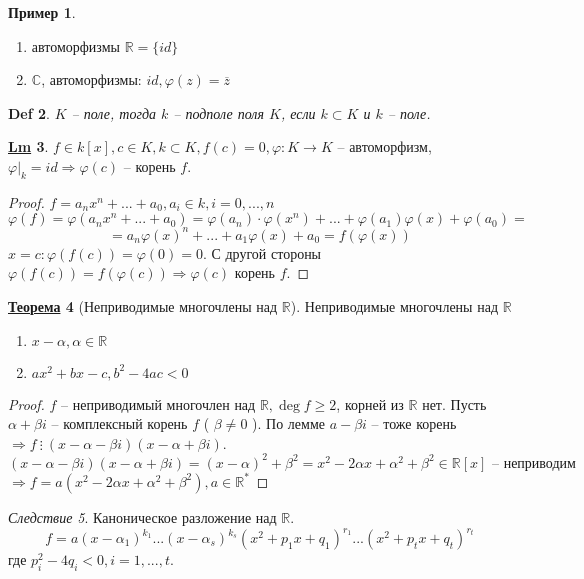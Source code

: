 \documentclass[12pt]{article}
\newenvironment{MyList}[1][4pt]{
  \begin{enumerate}[1.]
  \setlength{\parskip}{0pt}
  \setlength{\itemsep}{#1}
}{       
  \end{enumerate}
}
\def\C{\mathbb{C}}       %
\def\R{\mathbb{R}}       %
\def\PHI{\varphi}        %
\def\SO{\Rightarrow}     %
\theoremstyle{definition} %
\newtheorem{Thm}{\underline{Теорема}}[subsection] %
\newtheorem{Lm}[Thm]{\underline{Lm}} %
\newtheorem{Example}[Thm]{Пример} %
\theoremstyle{plain} %
\newtheorem{Def}[Thm]{Def} %
\theoremstyle{remark} %
\newtheorem{Cons}[Thm]{Следствие} %
\begin{document}
{\begin{Example}
\begin{MyList}
        \item автоморфизмы $\R = \{id\}$
        \item $\C$, автоморфизмы: $id, \PHI(z) = \overline{z}$   
    \end{MyList}
\end{Example}

\begin{Def}
    $K$ -- поле, тогда $k$ -- подполе поля $K$, если $k \subset K$ и $k$ -- поле.
\end{Def}

\begin{Lm}
    $f \in k[x], c \in K, k \subset K, f(c) = 0, \PHI : K \to K$ -- автоморфизм, $\PHI |_k = id \SO \PHI(c) $ -- корень $f$.
\end{Lm}

\begin{proof}
    $f = a_n x^n + ... + a_0, a_i \in k, i = 0, ..., n$
    \[\PHI(f) = \PHI(a_n x^n + ... + a_0) = \PHI(a_n) \cdot \PHI(x^n) + ... + \PHI(a_1) \PHI(x) + \PHI(a_0) =\]
    \[= a_n \PHI(x)^n + ... + a_1 \PHI(x) + a_0 = f(\PHI(x))\]
    $x = c : \PHI(f(c)) = \PHI(0) = 0$. С другой стороны $\PHI(f(c)) = f(\PHI(c)) \SO \PHI(c)$ корень $f$. 
\end{proof}

\begin{Thm}[Неприводимые многочлены над $\R$]
    Неприводимые многочлены над $\R$ 

    \begin{MyList}
        \item $x - \alpha, \alpha \in \R$ 
        \item $ax^2 + bx - c, b^2 - 4ac < 0$ 
    \end{MyList}
\end{Thm}

\begin{proof}
    $f$ -- неприводимый многочлен над $\R, \deg f \geqslant 2$, корней из $\R$ нет.
    Пусть $\alpha + \beta i$ -- комплексный корень $f$ ( $\beta \neq 0$ ). По лемме $a - \beta i $ -- тоже корень $\SO f \ \vdots \ (x - \alpha - \beta i)(x - \alpha + \beta i)$.
    \[(x - \alpha - \beta i)(x - \alpha + \beta i) = (x - \alpha)^2 + \beta^2 = x^2 - 2\alpha x + \alpha^2 + \beta^2 \in \R[x] \text{ -- неприводим}\]  
    $\SO f = a(x^2 - 2 \alpha x + \alpha^2 + \beta^2), a \in \R^*$ 
\end{proof}

\begin{Cons}
    Каноническое разложение над $\R$. 
    \[f = a(x - \alpha_1)^{k_1} ... (x - \alpha_s)^{k_s} (x^2 + p_1 x + q_1)^{r_1} ... (x^2 + p_t x + q_t)^{r_t}\]
    где $p_i^2 - 4q_i < 0, i = 1, ..., t$.  
\end{Cons}

}
\end{document}
